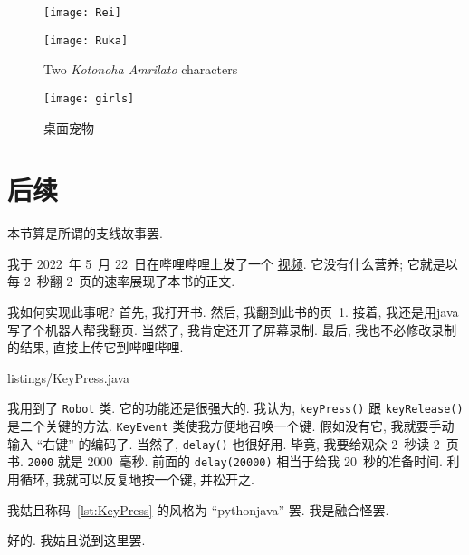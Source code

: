 \begin{figure}[h!]
    \centering
    \begin{minipage}{0.3\textwidth}
        \texttt{[image: Rei]}
    \end{minipage}
    \hspace{0.15\textwidth}
    \begin{minipage}{0.3\textwidth}
        \texttt{[image: Ruka]}
    \end{minipage}
    \caption{Two \textit{Kotonoha Amrilato} characters}
\end{figure}

\begin{figure}[h!]
    \centering
    \texttt{[image: girls]}
    \caption{桌面宠物}
    \label{fig:Girls}
\end{figure}

\section{后续}

\begin{remark*}
    本节算是所谓的支线故事罢.
\end{remark*}

我于 2022~年 5~月 22~日在哔哩哔哩上发了一个%
\href{https://www.bilibili.com/video/BV1JY4y157BX}{视频}.
它没有什么营养;
它就是以每 2~秒翻 2~页的速率展现了本书的正文.

我如何实现此事呢?
首先, 我打开书.
然后, 我翻到此书的页~1.
接着, 我还是用\gls{java}写了个机器人帮我翻页.
当然了, 我肯定还开了屏幕录制.
最后, 我也不必修改录制的结果, 直接上传它到哔哩哔哩.


{listings/KeyPress.java}

我用到了 \verb`Robot` 类.
它的功能还是很强大的.
我认为,
\verb`keyPress()` 跟 \verb`keyRelease()`
是二个关键的方法.
\verb`KeyEvent` 类使我方便地召唤一个键.
假如没有它,
我就要手动输入 ``右键'' 的编码了.
当然了, \verb`delay()` 也很好用.
毕竟, 我要给观众 2~秒读 2~页书.
\verb`2000` 就是 \num{2000}~毫秒.
前面的 \verb`delay(20000)` 相当于给我
20~秒的准备时间.
利用循环, 我就可以反复地按一个键, 并松开之.

我姑且称码~\ref{lst:KeyPress} 的风格为
``\gls{python}\gls{java}'' 罢.
我是融合怪罢.

好的.
我姑且说到这里罢.
